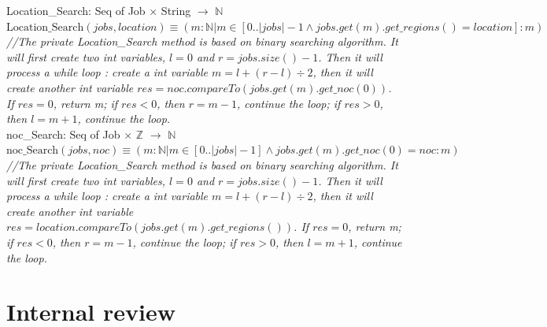 \documentclass[12pt]{article}
\begin{document}
\noindent Location\_Search: Seq of Job $\times$ String  $ \rightarrow $ $\mathbb{N}$\\
\noindent $\text{Location\_Search}(jobs, location) \equiv (m: \mathbb{N} | m \in [0 .. |jobs|-1 \wedge jobs.get(m).get\_regions() = location]
: m)$\\

\noindent \textit{//The private Location\_Search method is based on binary searching algorithm. It will first create two int variables, $l = 0$ and $r = jobs.size()-1$. Then it will process a while loop : create a int variable $m = l + (r - l) \div 2$, then it will create another int variable $res = noc.compareTo(jobs.get(m).get\_noc(0))$. If $res = 0$, return m; if $res < 0$, then $r = m-1$, continue the loop; if $res > 0$, then $l = m + 1$, continue the loop.}\\

\noindent noc\_Search: Seq of Job $\times$ $\mathbb{Z}$  $ \rightarrow $ $\mathbb{N}$\\
\noindent $\text{noc\_Search}(jobs, noc) \equiv (m: \mathbb{N} | m \in [0 .. |jobs|-1] \wedge jobs.get(m).get\_noc(0) = noc
: m)$\\

\noindent \textit{//The private Location\_Search method is based on binary searching algorithm. It will first create two int variables, $l = 0$ and $r = jobs.size()-1$. Then it will process a while loop : create a int variable $m = l + (r - l) \div 2$, then it will create another int variable $res = location.compareTo(jobs.get(m).get\_regions())$. If $res = 0$, return m; if $res < 0$, then $r = m-1$, continue the loop; if $res > 0$, then $l = m + 1$, continue the loop.}\\

\section{Internal review}
\end{document}
